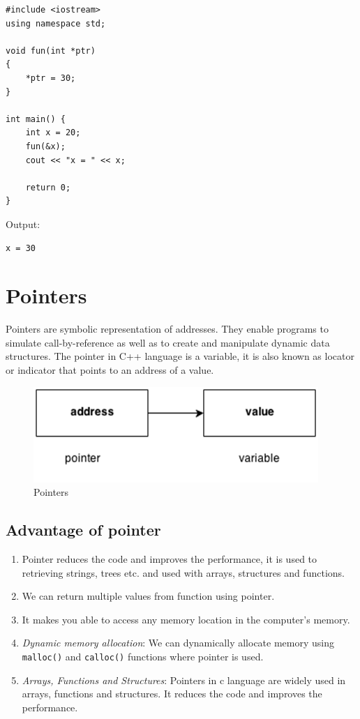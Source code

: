 \documentclass{book}
\begin{document}
\begin{lstlisting}
#include <iostream>
using namespace std;

void fun(int *ptr)
{
	*ptr = 30;
}

int main() {
	int x = 20;
	fun(&x);
	cout << "x = " << x;
	
	return 0;
}

\end{lstlisting}

Output:

\begin{verbatim}
x = 30
\end{verbatim}


\section{Pointers}

Pointers are symbolic representation of addresses. They enable programs to simulate call-by-reference as well as to create and manipulate dynamic data structures. The pointer in C++ language is a variable, it is also known as locator or indicator that points to an address of a value.

\begin{figure}[h]
\includegraphics[width=\columnwidth]{pointers}%
\caption{Pointers}%
\label{}%
\end{figure}

\subsection{Advantage of pointer}

\begin{enumerate}
	\item Pointer reduces the code and improves the performance, it is used to retrieving strings, trees etc. and used with arrays, structures and functions.

\item We can return multiple values from function using pointer.
\item It makes you able to access any memory location in the computer's memory.
\item  \textit{Dynamic memory allocation}: We can dynamically allocate memory using \texttt{malloc()} and \texttt{calloc()} functions where pointer is used.
	\item \textit{Arrays, Functions and Structures}: Pointers in c language are widely used in arrays, functions and structures. It reduces the code and improves the performance.
\end{enumerate}
\end{document}
